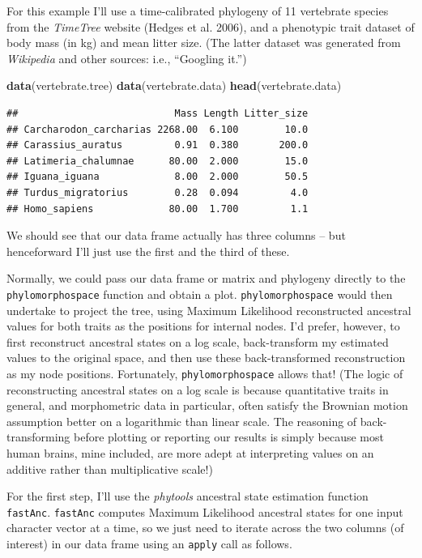 \documentclass[fleqn,10pt,lineno]{wlpeerj} %
\newenvironment{Shaded}{\begin{snugshade}}{\end{snugshade}}
\newcommand{\FunctionTok}[1]{\textcolor[rgb]{0.13,0.29,0.53}{\textbf{#1}}}
\newcommand{\NormalTok}[1]{#1}
\begin{document}
For this example I'll use a time-calibrated phylogeny of 11 vertebrate species from the \emph{TimeTree} website (Hedges et al. 2006), and a phenotypic trait dataset of body mass (in kg) and mean litter size. (The latter dataset was generated from \emph{Wikipedia} and other sources: i.e., ``Googling it.'')

\begin{Shaded}
\begin{Highlighting}[]
\FunctionTok{data}\NormalTok{(vertebrate.tree)}
\FunctionTok{data}\NormalTok{(vertebrate.data)}
\FunctionTok{head}\NormalTok{(vertebrate.data)}
\end{Highlighting}
\end{Shaded}

\begin{verbatim}
##                           Mass Length Litter_size
## Carcharodon_carcharias 2268.00  6.100        10.0
## Carassius_auratus         0.91  0.380       200.0
## Latimeria_chalumnae      80.00  2.000        15.0
## Iguana_iguana             8.00  2.000        50.5
## Turdus_migratorius        0.28  0.094         4.0
## Homo_sapiens             80.00  1.700         1.1
\end{verbatim}

We should see that our data frame actually has three columns -- but henceforward I'll just use the first and the third of these.

Normally, we could pass our data frame or matrix and phylogeny directly to the \texttt{phylomorphospace} function and obtain a plot. \texttt{phylomorphospace} would then undertake to project the tree, using Maximum Likelihood reconstructed ancestral values for both traits as the positions for internal nodes. I'd prefer, however, to first reconstruct ancestral states on a log scale, back-transform my estimated values to the original space, and then use these back-transformed reconstruction as my node positions. Fortunately, \texttt{phylomorphospace} allows that! (The logic of reconstructing ancestral states on a log scale is because quantitative traits in general, and morphometric data in particular, often satisfy the Brownian motion assumption better on a logarithmic than linear scale. The reasoning of back-transforming before plotting or reporting our results is simply because most human brains, mine included, are more adept at interpreting values on an additive rather than multiplicative scale!)

For the first step, I'll use the \emph{phytools} ancestral state estimation function \texttt{fastAnc}. \texttt{fastAnc} computes Maximum Likelihood ancestral states for one input character vector at a time, so we just need to iterate across the two columns (of interest) in our data frame using an \texttt{apply} call as follows.
\end{document}
